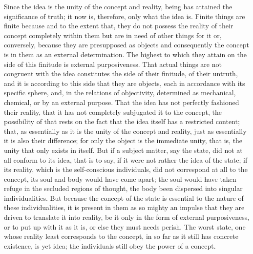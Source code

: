 Since the idea is the unity of the concept and reality,
being has attained the significance of truth;
it now is, therefore, only what the idea is.
Finite things are finite because
and to the extent that,
they do not possess the reality of
their concept completely within them
but are in need of other things for it
or, conversely,
because they are presupposed as objects
and consequently the concept is in them
as an external determination.
The highest to which they attain on
the side of this finitude is external purposiveness.
That actual things are not congruent with the idea
constitutes the side of their finitude, of their untruth,
and it is according to this side that they are objects,
each in accordance with its specific sphere,
and, in the relations of objectivity, determined
as mechanical, chemical, or by an external purpose.
That the idea has not perfectly fashioned their reality,
that it has not completely subjugated it to the concept,
the possibility of that rests on the fact that
the idea itself has a restricted content;
that, as essentially as it is
the unity of the concept and reality,
just as essentially it is also their difference;
for only the object is the immediate unity, that is,
the unity that only exists in itself.
But if a subject matter, say the state,
did not at all conform to its idea,
that is to say, if it were not rather
the idea of the state;
if its reality, which is the self-conscious individuals,
did not correspond at all to the concept,
its soul and body would have come apart;
the soul would have taken refuge in the secluded regions of thought,
the body been dispersed into singular individualities.
But because the concept of the state is essential
to the nature of these individualities,
it is present in them as so mighty an impulse
that they are driven to translate it into reality,
be it only in the form of external purposiveness,
or to put up with it as it is,
or else they must needs perish.
The worst state, one whose reality least corresponds to the concept,
in so far as it still has concrete existence, is yet idea;
the individuals still obey the power of a concept.

